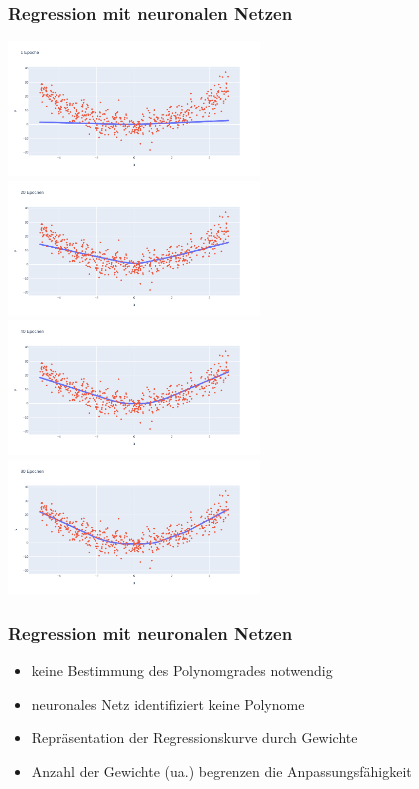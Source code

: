 \begin{frame}
\frametitle{Regression mit neuronalen Netzen}

\begin{center}
	\includegraphics[width=0.5\textwidth]{fig7/nn_e1.png}%
	\includegraphics[width=0.5\textwidth]{fig7/nn_e20.png}
	\includegraphics[width=0.5\textwidth]{fig7/nn_e40.png}%
	\includegraphics[width=0.5\textwidth]{fig7/nn_e80.png}
\end{center}
	
\end{frame}


\begin{frame}
\frametitle{Regression mit neuronalen Netzen}

\begin{itemize}
	\item keine Bestimmung des Polynomgrades notwendig
	\item neuronales Netz identifiziert keine Polynome
	\item Repräsentation der Regressionskurve durch Gewichte
	\item Anzahl der Gewichte (ua.) begrenzen die Anpassungsfähigkeit
\end{itemize}

\end{frame}


